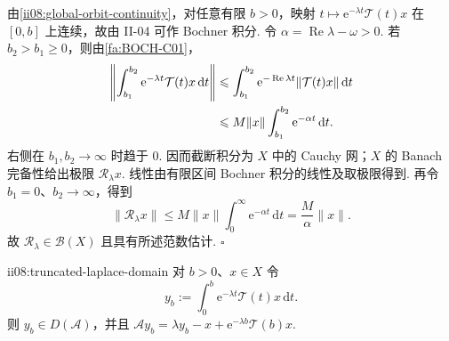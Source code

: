 \begin{FAProof}
由\autoref{ii08:global-orbit-continuity}，对任意有限 \(\displaystyle b>0\)，映射 \(\displaystyle t\mapsto\mathrm{e}^{-\lambda t}\mathcal T(t)x\) 在 \(\displaystyle[0,b]\) 上连续，故由 II-04 可作 Bochner 积分. 令 \(\displaystyle\alpha=\operatorname{Re}\lambda-\omega>0\). 若 \(\displaystyle b_2>b_1\geqslant0\)，则由\autoref{fa:BOCH-C01}，
\[
\begin{aligned}
\displaystyle \left\| \int_{b_1}^{b_2}\mathrm{e}^{-\lambda t}\mathcal T(t)x\,\mathrm{d}t \right\| &\displaystyle \leqslant \int_{b_1}^{b_2}\mathrm{e}^{-\operatorname{Re}\lambda t}\|\mathcal T(t)x\|\,\mathrm{d}t\\
\displaystyle &\displaystyle \leqslant M\|x\|\int_{b_1}^{b_2}\mathrm{e}^{-\alpha t}\,\mathrm{d}t.
\end{aligned}
\]
右侧在 \(\displaystyle b_1,b_2\to\infty\) 时趋于 \(\displaystyle0\). 因而截断积分为 \(\displaystyle X\) 中的 Cauchy 网；\(\displaystyle X\) 的 Banach 完备性给出极限 \(\displaystyle\mathcal R_\lambda x\). 线性由有限区间 Bochner 积分的线性及取极限得到. 再令 \(\displaystyle b_1=0\)、\(\displaystyle b_2\to\infty\)，得到
\[
\|\mathcal R_\lambda x\|
\leqslant
M\|x\|\int_0^\infty\mathrm{e}^{-\alpha t}\,\mathrm{d}t
=
\frac{M}{\alpha}\|x\|.
\]
故 \(\displaystyle\mathcal R_\lambda\in\mathcal B(X)\) 且具有所述范数估计.
\hfill\(\square\)
\end{FAProof}

\begin{FAProposition}{ii08:truncated-laplace-domain}
对 \(\displaystyle b>0\)、\(\displaystyle x\in X\) 令
\[
y_b
:=
\int_0^b\mathrm{e}^{-\lambda t}\mathcal T(t)x\,\mathrm{d}t.
\]
则 \(\displaystyle y_b\in D(\mathcal A)\)，并且
\(\displaystyle \mathcal Ay_b = \lambda y_b-x+ \mathrm{e}^{-\lambda b}\mathcal T(b)x.\)
\end{FAProposition}

